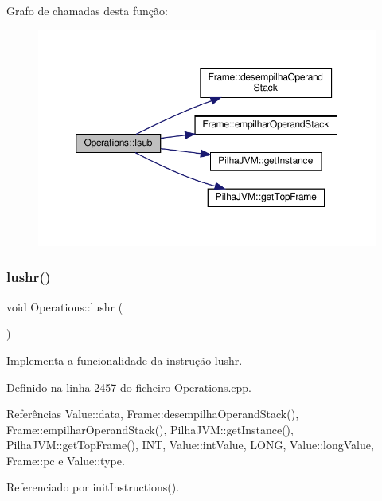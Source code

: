 Grafo de chamadas desta função\+:
\nopagebreak
\begin{figure}[H]
\begin{center}
\leavevmode
\includegraphics[width=350pt]{classOperations_a32485b21761b1e5540a6575822a2661a_cgraph}
\end{center}
\end{figure}
\mbox{\label{classOperations_a3b7c61f8bca7b3ad0dacae6649aee042}} 
\subsubsection{\texorpdfstring{lushr()}{lushr()}}
{\footnotesize\ttfamily void Operations\+::lushr (\begin{DoxyParamCaption}{ }\end{DoxyParamCaption})\hspace{0.3cm}{\ttfamily [private]}}



Implementa a funcionalidade da instrução lushr. 



Definido na linha 2457 do ficheiro Operations.\+cpp.



Referências Value\+::data, Frame\+::desempilha\+Operand\+Stack(), Frame\+::empilhar\+Operand\+Stack(), Pilha\+J\+V\+M\+::get\+Instance(), Pilha\+J\+V\+M\+::get\+Top\+Frame(), I\+NT, Value\+::int\+Value, L\+O\+NG, Value\+::long\+Value, Frame\+::pc e Value\+::type.



Referenciado por init\+Instructions().

